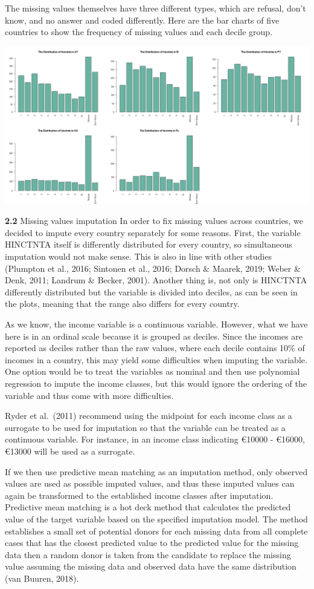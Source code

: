 \documentclass[
]{article}
\begin{document}
The missing values themselves have three different types, which are
refusal, don't know, and no answer and coded differently. Here are the
bar charts of five countries to show the frequency of missing values and
each decile group.

\includegraphics[width=1\linewidth]{pics/plot_zoom}

\textbf{2.2} Missing values imputation In order to fix missing values
across countries, we decided to impute every country separately for some
reasons. First, the variable HINCTNTA itself is differently distributed
for every country, so simultaneous imputation would not make sense. This
is also in line with other studies (Plumpton et al., 2016; Sintonen et
al., 2016; Dorsch \& Maarek, 2019; Weber \& Denk, 2011; Landrum \&
Becker, 2001). Another thing is, not only is HINCTNTA differently
distributed but the variable is divided into deciles, as can be seen in
the plots, meaning that the range also differs for every country.

As we know, the income variable is a continuous variable. However, what
we have here is in an ordinal scale because it is grouped as deciles.
Since the incomes are reported as deciles rather than the raw values,
where each decile contains 10\% of incomes in a country, this may yield
some difficulties when imputing the variable. One option would be to
treat the variables as nominal and then use polynomial regression to
impute the income classes, but this would ignore the ordering of the
variable and thus come with more difficulties.

Ryder et al.~(2011) recommend using the midpoint for each income class
as a surrogate to be used for imputation so that the variable can be
treated as a continuous variable. For instance, in an income class
indicating €10000 - €16000, €13000 will be used as a surrogate.

If we then use predictive mean matching as an imputation method, only
observed values are used as possible imputed values, and thus these
imputed values can again be transformed to the established income
classes after imputation. Predictive mean matching is a hot deck method
that calculates the predicted value of the target variable based on the
specified imputation model. The method establishes a small set of
potential donors for each missing data from all complete cases that has
the closest predicted value to the predicted value for the missing data
then a random donor is taken from the candidate to replace the missing
value assuming the missing data and observed data have the same
distribution (van Buuren, 2018).
\end{document}
